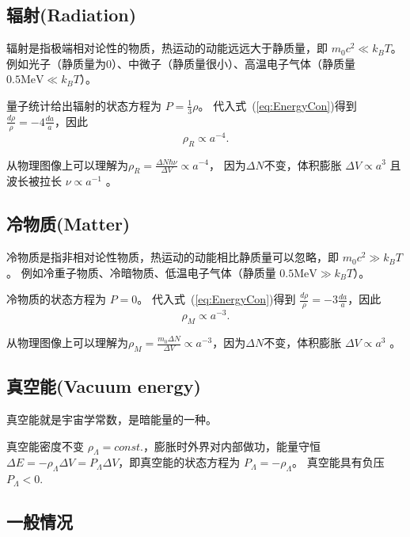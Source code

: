 \documentclass[12pt]{ctexart}
\newcommand{\refeq}[1]{式~(\ref{#1})}
\begin{document}
\subsection{辐射(Radiation)}

辐射是指极端相对论性的物质，热运动的动能远远大于静质量，即 $m_0 c^2 \ll k_B T$。
例如光子（静质量为0）、中微子（静质量很小）、高温电子气体（静质量 $0.5 \mathrm{MeV} \ll k_B T$）。

量子统计给出辐射的状态方程为 $P=\frac{1}{3}\rho$。
代入\refeq{eq:EnergyCon}得到 $\frac{d\rho}{\rho} = -4\frac{da}{a}$，因此 
\begin{equation}
    \rho_R\propto a^{-4}.
\end{equation}

从物理图像上可以理解为$\rho_R = \frac{\Delta N \hbar\nu }{\Delta V}\propto a^{-4}$， 因为$\Delta N$不变，体积膨胀 $\Delta V \propto a^{3}$ 且 波长被拉长 $\nu \propto a^{-1}$ 。

\subsection{冷物质(Matter)}

冷物质是指非相对论性物质，热运动的动能相比静质量可以忽略，即 $m_0 c^2 \gg k_B T$。
例如冷重子物质、冷暗物质、低温电子气体（静质量 $0.5 \mathrm{MeV} \gg k_B T$）。

冷物质的状态方程为 $P=0$。
代入\refeq{eq:EnergyCon}得到 $\frac{d\rho}{\rho} = -3\frac{da}{a}$，因此
\begin{equation}
    \rho_M\propto a^{-3}.
\end{equation} 

从物理图像上可以理解为$\rho_M = \frac{m_0 \Delta N}{\Delta V}\propto a^{-3}$，因为$\Delta N$不变，体积膨胀 $\Delta V \propto a^{3}$ 。

\subsection{真空能(Vacuum energy)}

真空能就是宇宙学常数，是暗能量的一种。

真空能密度不变 $\rho_\Lambda=const.$，膨胀时外界对内部做功，能量守恒$\Delta E = -\rho_\Lambda \Delta V = P_\Lambda \Delta V$，即真空能的状态方程为 $P_\Lambda = -\rho_\Lambda$。 真空能具有负压 $P_\Lambda < 0 $.

\subsection{一般情况}
\end{document}
